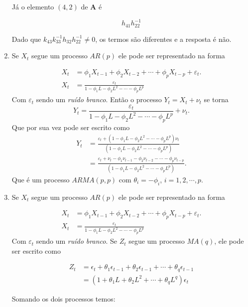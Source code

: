 \begin{enumerate}
	 Já o elemento $(4,2)$ de $\mathbf{A}$ é 
	 
	 $$h_{41}h_{22}^{-1}$$
	 
	 Dado que $k_{43}k_{33}^{-1}h_{32}h_{22}^{-1}\neq 0$, os termos são diferentes e a resposta é não.
	 
	 \item[\fbox{4.5}]
	 
	 Se $X_t$ segue um processo $AR(p)$ ele pode ser representado na forma 
	
	\begin{align*}
		X_t&=\phi_1X_{t-1}+\phi_2X_{t-2}+\cdots+\phi_pX_{t-p}+\varepsilon_t.\\
		X_t&=\frac{\varepsilon_t}{1-\phi_1L-\phi_2L^2-\cdots-\phi_pL^p}
	\end{align*}
	Com $\varepsilon_t$ sendo um \emph{ruído branco}. Então o processo $Y_t=X_t+\nu_t$ se torna 
	$$Y_t=\frac{\varepsilon_t}{1-\phi_1L-\phi_2L^2-\cdots-\phi_pL^p}+\nu_t.$$ 
	Que por sua vez pode ser escrito como
	\begin{align*}
		Y_t&=\frac{\varepsilon_t+(1-\phi_1L-\phi_2L^2-\cdots-\phi_pL^p)\nu_t}{(1-\phi_1L-\phi_2L^2-\cdots-\phi_pL^p)}\\
		&=\frac{\varepsilon_t+\nu_t-\phi_1\nu_{t-1}-\phi_2\nu_{t-2}-\cdots-\phi_p\nu_{t-p}}{(1-\phi_1L-\phi_2L^2-\cdots-\phi_pL^p)}.
	\end{align*}
	Que é um processo $ARMA(p,p)$ com $\theta_i=-\phi_i$, $i=1,2,\cdots,p$.
	
	\item[\fbox{4.6}]
		
		Se $X_t$ segue um processo $AR(p)$ ele pode ser representado na forma 
		
		\begin{align*}
			X_t&=\phi_1X_{t-1}+\phi_2X_{t-2}+\cdots+\phi_pX_{t-p}+\varepsilon_t.\\
			X_t&=\frac{\varepsilon_t}{1-\phi_1L-\phi_2L^2-\cdots-\phi_pL^p}
		\end{align*}
		Com $\varepsilon_t$ sendo um \emph{ruído branco}. Se $Z_t$ segue um processo $MA(q)$, ele pode ser escrito como
		
		\begin{align*}
			Z_t&=\epsilon_t+\theta_1\epsilon_{t-1}+\theta_2\epsilon_{t-1}+\cdots+\theta_q\epsilon_{t-1}\\
			&=(1+\theta_1L+\theta_2L^2+\cdots+\theta_qL^q)\epsilon_t
		\end{align*}
		
		Somando os dois processos temos:
		

\end{enumerate}
